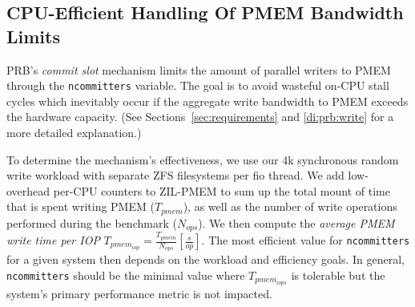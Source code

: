 \documentclass[12pt,a4paper,twoside]{book}
\begin{document}
\subsection{CPU-Efficient Handling Of PMEM Bandwidth Limits}\label{sec:ncommitters_scalability}

PRB's \textit{commit slot} mechanism limits the amount of parallel writers to PMEM through the \lstinline{ncommitters} variable.
The goal is to avoid wasteful on-CPU stall cycles which inevitably occur if the aggregate write bandwidth to PMEM exceeds the hardware capacity.
(See Sections~\ref{sec:requirements} and \ref{di:prb:write} for a more detailed explanation.)

To determine the mechanism's effectiveness, we use our 4k synchronous random write workload with separate ZFS filesystems per fio thread.
We add low-overhead per-CPU counters to ZIL-PMEM to sum up the total mount of time that is spent writing PMEM ($T_{pmem}$), as well as the number of write operations performed during the benchmark ($N_{ops}$).
We then compute the \textit{average PMEM write time per IOP} $T_{pmem_{iop}} = \frac{T_{pmem}}{N_{ops}} [\frac{s}{op}]$.
The most efficient value for \lstinline{ncommitters} for a given system then depends on the workload and efficiency goals.
In general, \lstinline{ncommitters} should be the minimal value where $T_{pmem_{iops}}$ is tolerable but the system's primary performance metric is not impacted.
\end{document}
